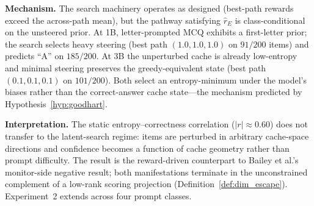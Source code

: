 \textbf{Mechanism.} The search machinery operates as designed (best-path rewards exceed the across-path mean), but the pathway satisfying $\hat{r}_E$ is class-conditional on the unsteered prior. At 1B, letter-prompted MCQ exhibits a first-letter prior; the search selects heavy steering (best path $(1.0,1.0,1.0)$ on $91/200$ items) and predicts ``A'' on $185/200$. At 3B the unperturbed cache is already low-entropy and minimal steering preserves the greedy-equivalent state (best path $(0.1,0.1,0.1)$ on $101/200$). Both select an entropy-minimum under the model's biases rather than the correct-answer cache state---the mechanism predicted by Hypothesis~\ref{hyp:goodhart}.

\textbf{Interpretation.} The static entropy--correctness correlation ($|r| \approx 0.60$) does not transfer to the latent-search regime: items are perturbed in arbitrary cache-space directions and confidence becomes a function of cache geometry rather than prompt difficulty. The result is the reward-driven counterpart to Bailey et al.'s~\cite{bailey2024obfuscated} monitor-side negative result; both manifestations terminate in the unconstrained complement of a low-rank scoring projection (Definition~\ref{def:dim_escape}). Experiment~2 extends across four prompt classes.

